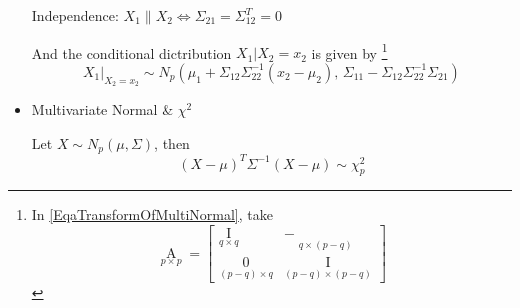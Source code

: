 \begin{itemize}[topsep=6pt,itemsep=4pt]
        Independence: $ X_1\parallel X_2\Leftrightarrow \Sigma _{21}=\Sigma _{12}^T=0  $

        And the conditional dictribution $ X_1|X_2=x_2 $ is given by \footnote{In \autoref{EqaTransformOfMultiNormal}, take 
        \begin{equation}
            \mathop{A}\limits_{p\times p}=\begin{bmatrix}
                \mathop{I}\limits_{q\times q} & -\mathop{\Sigma _{12}\Sigma _{22}^{-1}}\limits_{q\times (p-q)} \\
                \mathop{0}\limits_{(p-q)\times q}&\mathop{I}\limits_{(p-q)\times (p-q)}  
            \end{bmatrix}  
        \end{equation}
        
        }
        \begin{equation}
            X_1|_{X_2=x_2}\sim N_p(\mu_1+\Sigma _{12}\Sigma _{22}^{-1}(x_2-\mu_2),\,\Sigma _{11}-\Sigma _{12}\Sigma _{22}^{-1}\Sigma _{21})
        \end{equation}

        \item Multivariate Normal \& $ \chi^2 $
        
         Let $ X\sim N_p(\mu,\Sigma ) $, then 
         \begin{equation}
             (X-\mu)^T\Sigma ^{-1}(X-\mu)\sim \chi_p^2 
         \end{equation}
         
        
        
        
        
        
        
    \end{itemize}
    
        








